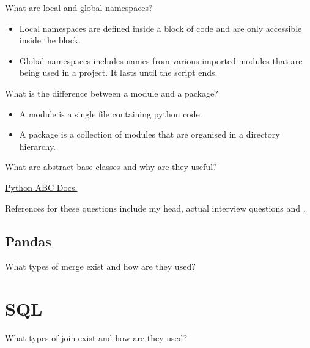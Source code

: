 \begin{questions}
\question[2] What are local and global namespaces?
\begin{solution}
\begin{itemize}
    \item Local namespaces are defined inside a block of code and are only accessible inside the block.
    \item Global namespaces includes names from various imported modules that are being used in a project. It lasts until the script ends.
\end{itemize}
\end{solution}

\question What is the difference between a module and a package?
\begin{solution}
\begin{itemize}
    \item A module is a single file containing python code.
    \item A package is a collection of modules that are organised in a directory hierarchy.
\end{itemize}
\end{solution}

\question What are abstract base classes and why are they useful?
\begin{solution}
\href{https://docs.python.org/3/library/abc.html}{Python ABC Docs.}
\end{solution}
\end{questions}

References for these questions include my head, actual interview questions and \cite{Hackr23}.

\subsection{Pandas}

\begin{questions}
\question What types of merge exist and how are they used?
\begin{solution}

\end{solution}
\end{questions}

\section{SQL}

\begin{questions}
\question What types of join exist and how are they used?
\begin{solution}

\end{solution}
\end{questions}

